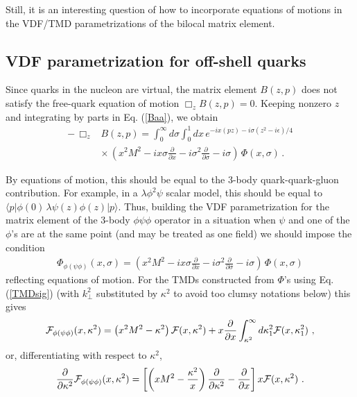 \documentclass[final,5p,times,twocolumn]{elsarticle}
\begin{document}
Still,  it is an interesting question of how to incorporate  equations of motions
in the VDF/TMD parametrizations of 
the  bilocal matrix element. 




\subsection{VDF parametrization for off-shell quarks} 

Since   quarks in the nucleon are virtual,  the  matrix element 
$B(z,p)$  does not satisfy the free-quark equation of motion $\Box_z B(z,p)=0$. 
Keeping nonzero $z$ and integrating by parts in Eq. (\ref{Baa}),  we obtain 
\begin{align}
- \, \Box_z & B(z,p) = 
\int_{0}^{\infty} d \sigma \int_{0}^1 dx\, e^{-i x (pz) -i \sigma {(z^2-i \epsilon )}/{4}}   \nonumber \\ & \times 
\, \left (x^2 M^2 -i x \sigma \frac{\partial}{\partial x}  - i \sigma^2  \frac{\partial}{\partial \sigma }  
 -i \sigma \right ) \,  \Phi (x,\sigma) \,. 
 \label{VDFz}
\end{align} 

By equations of motion, this should be equal to  the 3-body quark-quark-gluon 
  contribution. 
For example, in a $\lambda \phi^2 \psi $ scalar model, 
 this should be equal to $\langle  p |  \phi (0) \, \lambda  \psi (z)  \phi(z)  | p \rangle 
$.
Thus, building 
the VDF  parametrization for the  matrix element  of the 3-body $ \phi  \psi \phi$ 
operator in a   situation  when $\psi$ and one of the $\phi$'s  are at the same point 
(and may be treated as one field)
we should impose the condition 
  \begin{align}
 \Phi_{\phi (\psi \phi)}  (x,\sigma) 
=
 \left (x^2 M^2 -i x \sigma \frac{\partial}{\partial x}  
 - i \sigma^2  \frac{\partial}{\partial \sigma }   -i \sigma \right) \,  \Phi (x,\sigma)  \label{eqmocon}
\end{align} 
reflecting equations of motion.
For the TMDs constructed from $\Phi$'s using  Eq.  (\ref{TMDsig}) 
(with $k_\perp^2$ substituted by $\kappa^2$ to avoid 
too clumsy notations below) this gives
  \begin{align}
  {\cal F}_{ \phi (\psi \phi)} (x, \kappa^2) =
 \left (x^2 M^2 -\kappa^2\right ) {\cal F} (x, \kappa^2) + x  \frac{\partial}{\partial x}   \int_{\kappa^2}^\infty 
d  \kappa_1^2 {\cal F} (x, \kappa_1^2) \ ,
 \label{eqmocon2}
\end{align} 
or, differentiating with respect to $\kappa^2$,
  \begin{align}
 \frac{\partial}{\partial \kappa^2} {\cal F}_{\phi (\psi \phi)} (x, \kappa^2)=
 \left [ \left (x M^2 -\frac{\kappa^2}{x} \right ) \frac{\partial}{\partial \kappa^2} 
 -  \frac{\partial}{\partial x} \right ]  x  {\cal F} (x, \kappa^2)
 \ . 
 \label{eqmocon4}
\end{align}
\end{document}

